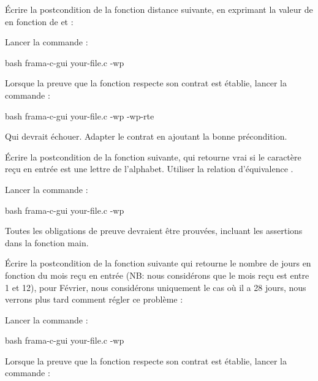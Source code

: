 Écrire la postcondition de la fonction distance suivante, en exprimant
la valeur de  en fonction de  et
 :




Lancer la commande :


\begin{CodeBlock}{bash}
frama-c-gui your-file.c -wp
\end{CodeBlock}


Lorsque la preuve que la fonction respecte son contrat est établie, lancer
la commande :

\begin{CodeBlock}{bash}
frama-c-gui your-file.c -wp -wp-rte
\end{CodeBlock}


Qui devrait échouer. Adapter le contrat en ajoutant la bonne précondition.




Écrire la postcondition de la fonction suivante, qui retourne vrai si le
caractère reçu en entrée est une lettre de l'alphabet. Utiliser la relation
d'équivalence  \CodeInline{<==>}.




Lancer la commande :


\begin{CodeBlock}{bash}
frama-c-gui your-file.c -wp
\end{CodeBlock}


Toutes les obligations de preuve devraient être prouvées, incluant les
assertions dans la fonction main.




Écrire la postcondition de la fonction suivante qui retourne le nombre de
jours en fonction du mois reçu en entrée (NB: nous considérons que le mois
reçu est entre 1 et 12), pour Février, nous considérons uniquement le cas
où il a 28 jours, nous verrons plus tard comment régler ce problème :




Lancer la commande :


\begin{CodeBlock}{bash}
frama-c-gui your-file.c -wp
\end{CodeBlock}


Lorsque la preuve que la fonction respecte son contrat est établie, lancer
la commande :

